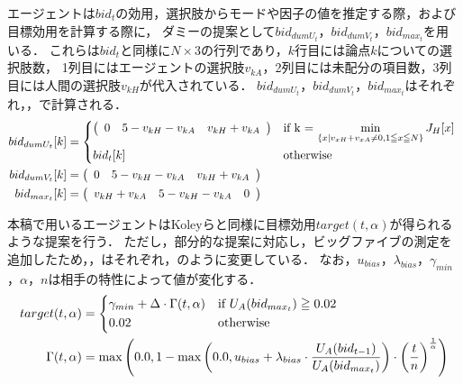 エージェントは$bid_t$の効用，選択肢からモードや因子の値を推定する際，および目標効用を計算する際に，
ダミーの提案として$bid_{dumU_t}$，$bid_{dumV_t}$，$bid_{max_t}$を用いる．
これらは$bid_t$と同様に$N \times 3$の行列であり，$k$行目には論点$k$についての選択肢数，
1列目にはエージェントの選択肢$v_{kA}$，2列目には未配分の項目数，3列目には人間の選択肢$v_{kH}$が代入されている．
$bid_{dumU_t}$，$bid_{dumV_t}$，$bid_{max_t}$はそれぞれ，，で計算される．
\begin{align}
    bid_{dumU_t}[k] &= 
    \begin{cases*}
        \left(
    \begin{array}{rrr}
        0 & 5 - v_{kH} - v_{kA} & v_{kH} + v_{kA}
    \end{array}
    \right) & if k = $\displaystyle \min_{\{x | v_{xH} + v_{xA} \neq 0, 1 \leqq x \leqq N \} } J_H[x]$ \\
        bid_t[k] & otherwise
    \end{cases*}
    \label{eq:dummyutil} \\
    bid_{dumV_t}[k] &= 
        \left(
    \begin{array}{rrr}
        0 & 5 - v_{kH} - v_{kA} & v_{kH} + v_{kA}
    \end{array}
    \right)
    \label{eq:dummyvalue} \\
    bid_{max_t}[k] &= 
        \left(
    \begin{array}{rrr}
        v_{kH} + v_{kA} & 5 - v_{kH} - v_{kA} & 0
    \end{array}
    \right)
    \label{eq:maxutil} 
\end{align}

本稿で用いるエージェントはKoleyらと同様に目標効用$target(t,\alpha)$が得られるような提案を行う．
ただし，部分的な提案に対応し，ビッグファイブの測定を追加したため，，はそれぞれ，のように変更している．
なお，$u_{bias}$，$\lambda_{bias}$，$\gamma_{min}$，$\alpha$，$n$は相手の特性によって値が変化する．
\begin{align}
    target(t,\alpha) &= 
    \begin{cases*}
        \gamma_{min} + \Delta \cdot \Gamma(t,\alpha) & if $U_A(bid_{max_t}) \geqq 0.02$  \\
        0.02 & otherwise 
    \end{cases*} \label{eq:newtarget}\\
    \Gamma(t,\alpha) &= \max \left( 0.0, 1 - \max \left( 0.0, u_{bias} + \lambda_{bias} \cdot \frac{U_A(bid_{t - 1})}{U_A(bid_{max_t})} \right) \cdot \left( \frac{t}{n} \right)^{\frac{1}{\alpha}} \right) \label{eq:newgamma}
\end{align}

